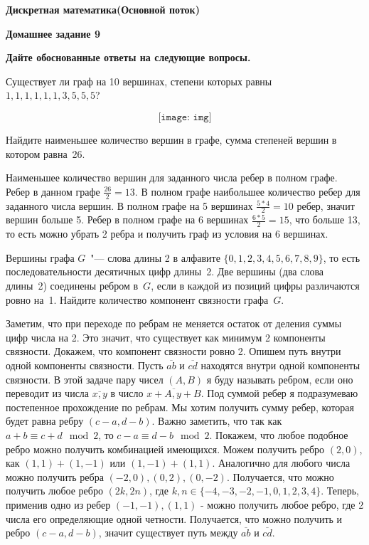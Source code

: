 \documentclass[11pt]{article}
\def\week{9}
\def\theproblem{К\week.\arabic{problem}}
\begin{document}
	\setcounter{problem}{0}
	\def\theproblem{Д\week.\arabic{problem}}
	{\textbf{\large Дискретная математика}\hfill \textbf{(Основной поток)}
		
		\medskip %
		
		\textbf{Домашнее задание \week}}
	
	\medskip
	
	\textbf{Дайте обоснованные ответы на следующие вопросы.}
	
	
	\vspace{5mm}
	
	
	
	\p Существует ли  граф на 10 вершинах, степени которых равны $1,1,1,1,1,1,3,5,5,5$?
	
	\[\texttt{[image: img]}\]
	
	\p Найдите наименьшее количество вершин в  графе,  сумма степеней
	вершин в котором равна~26.
	
	Наименьшее количество вершин для заданного числа ребер в полном графе. Ребер в данном графе $\frac{26}{2} = 13$. В полном графе наибольшее количество ребер для заданного числа вершин. В полном графе на 5 вершинах $\frac{5*4}{2} = 10$ ребер, значит вершин больше 5. Ребер в полном графе на 6 вершинах $\frac{6*5}{2} = 15$, что больше 13, то есть можно убрать 2 ребра и получить граф из условия на 6 вершинах. 
	
	 \sspace
	
	\p Вершины графа $G$~"--- слова длины 2 в алфавите
	$\{0,1,2,3,4,5,6,7,8,9\}$, то есть последовательности десятичных цифр
	длины~2. Две вершины (два слова длины~2) соединены ребром в~$G$, если
	в каждой из позиций цифры различаются ровно на~1. Найдите количество компонент связности графа~$G$.
	
	Заметим, что при переходе по ребрам не меняется остаток от деления суммы цифр числа на 2. Это значит, что существует как минимум 2 компоненты связности. Докажем, что компонент связности ровно 2. Опишем путь внутри одной компоненты связности. Пусть $\overline{ab}$ и $\overline{cd}$ находятся внутри одной компоненты связности. В этой задаче пару чисел $(A, B)$ я буду называть ребром, если оно переводит из числа $\overline{x , y}$ в число $\overline{x + A, y + B}$. Под суммой ребер я подразумеваю постепенное прохождение по ребрам. Мы хотим получить сумму ребер, которая будет равна ребру $(c - a, d - b)$. Важно заметить, что так как $a + b \equiv c + d \mod 2$, то $c - a \equiv d - b \mod 2$. Покажем, что любое подобное ребро можно получить комбинацией имеющихся.  Можем получить ребро $(2, 0)$, как $(1, 1)+(1, -1)$ или $(1, -1)+(1, 1)$. Аналогично для любого числа можно получить ребра $(-2, 0), (0, 2), (0, -2)$. Получается, что можно получить любое ребро $(2k, 2n)$, где $k, n \in \{-4,-3,-2,-1,0,1,2,3,4\}.$ Теперь, применив одно из ребер $(-1, -1), (1, 1)$ - можно получить любое ребро, где 2 числа его определяющие одной четности. Получается, что можно получить и ребро $(c - a, d - b)$, значит существует путь между $\overline{ab}$ и $\overline{cd}$.  \sspace
		
\end{document}
